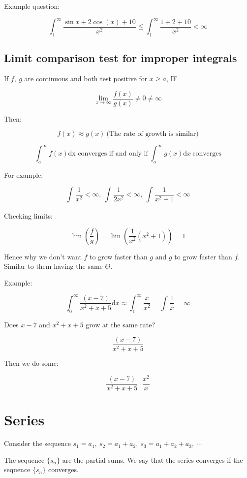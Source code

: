 \documentclass[12pt]{article}
\theoremstyle{plain}
\theoremstyle{remark}
\theoremstyle{definition}
\begin{document}
Example question:

\[\int_{1}^{\infty}\frac{\sin x + 2\cos(x) + 10}{x^{2}} \leq \int_{1}^{\infty}\frac{1 + 2 + 10}{x^{2}} < \infty\]


\subsection{Limit comparison test for improper
integrals}

If \(f,\ g\) are continuous and both test positive for \(x \geq a\), IF

\[\lim_{x \rightarrow \infty}\frac{f(x)}{g(x)} \neq 0 \neq \infty\]

Then:

\[f(x) \approx g(x)\ (\text{The\ rate\ of\ growth\ is\ similar)}\]

\[\int_{a}^{\infty}{f(x)}\text{dx\ }\text{converges\ if\ and\ only\ if}\ \int_{a}^{\infty}{g(x)\text{d}x}\ \text{converges}\]

For example:

\[\int_{}^{}\frac{1}{x^{2}} < \infty,\ \int_{}^{}{\frac{1}{2x^{2}} < \infty},\ \int_{}^{}\frac{1}{x^{2} + 1} < \infty\]

Checking limits:

\[\lim\left( \frac{f}{g} \right) = \lim\left( \frac{1}{x^{2}}\left( x^{2} + 1 \right) \right) = 1\]

Hence why we don't want \(f\) to grow faster than \(g\) and \(g\) to
grow faster than \(f\). Similar to them having the same \(\Theta\).

Example:

\[\int_{0}^{\infty}{\frac{(x - 7)}{x^{2} + x + 5}\text{d}x} \approx \int_{1}^{\infty}\frac{x}{x^{2}} = \int_{}^{}\frac{1}{x} = \infty\]

Does \(x - 7\) and \(x^{2} + x + 5\) grow at the same rate?

\[\frac{(x - 7)}{x^{2} + x + 5}\]

Then we do some:

\[\frac{(x - 7)}{x^{2} + x + 5} \cdot \frac{x^{2}}{x}\]


\section{Series}

Consider the sequence
\(s_{1} = a_{1},\ s_{2} = a_{1} + a_{2},\ s_{3} = a_{1} + a_{2} + a_{3},\ \cdots\)

The sequence \(\{ s_{n}\}\) are the partial sums. We say that the series
converges if the sequence \(\{ s_{n}\}\) converges.
\end{document}
